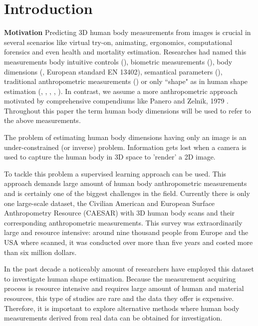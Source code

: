 \documentclass[runningheads]{llncs}
\begin{document}
\section{Introduction}\label{sec:intro}
\textbf{Motivation} 
Predicting 3D human body measurements from images is crucial in several 
scenarios 
like virtual try-on, animating, ergonomics, computational forensics and 
even health and mortality estimation. Researches had 
named this 
measurements body intuitive controls (\cite{Allen.2003}), biometric 
measurements (\cite{Sigal.2008}), body dimensions 
(\cite{DBLP:conf/bmvc/ChenRC11}, European standard EN 13402), semantical 
parameters (\cite{Yang.2014}), 
traditional anthropometric 
measurements 
(\cite{Wuhrer2011}) or only ``shape" as in human shape estimation 
(\cite{Guan.2013}, \cite{Bogo:ECCV:2016}, \cite{Loper.2015}, 
\cite{Dibra.2016a}, \cite{Pishchulin.2017}). In contrast, we assume a more 
anthropometric approach 
motivated by comprehensive compendiums like Panero and Zelnik, 1979 
\cite{panero1979human}.
Throughout this paper the term human body 
dimensions 
will be used to refer to the above measurements.

The problem of estimating human body dimensions  
having only an image is an under-constrained  (or inverse) problem. Information 
gets lost when a camera is 
used to capture the human body in 3D space to 'render' a 2D image.

To tackle this problem a supervised learning approach can be used. This approach
demands large amount of human body anthropometric measurements and is certainly 
one of the biggest challenges in the field.  Currently there 
is only one large-scale dataset, the Civilian American and 
European Surface Anthropometry Resource (CAESAR) \cite{robinette1999caesar} 
with 3D human body scans and their corresponding anthropometric measurements. 
This survey was extraordinarily large and resource intensive: around nine 
thousand people from Europe and the USA where scanned, it was conducted over 
more than five years and costed more than six million dollars.

In the past decade a noticeably amount of researchers have employed this 
dataset to investigate human shape estimation. Because the measurement 
acquiring process is resource intensive and requires large amount of human and 
material resources, this type of studies are rare and the data they offer is 
expensive. Therefore, it is important to explore alternative methods where 
human body measurements derived from real data can be obtained for 
investigation.
\end{document}
